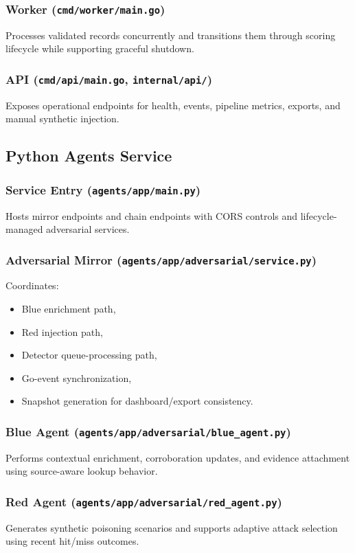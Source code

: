 \documentclass[11pt,a4paper]{article}
\begin{document}
\subsubsection*{Worker (\texttt{cmd/worker/main.go})}
Processes validated records concurrently and transitions them through scoring lifecycle while supporting graceful shutdown.

\subsubsection*{API (\texttt{cmd/api/main.go}, \texttt{internal/api/})}
Exposes operational endpoints for health, events, pipeline metrics, exports, and manual synthetic injection.

\subsection{Python Agents Service}

\subsubsection*{Service Entry (\texttt{agents/app/main.py})}
Hosts mirror endpoints and chain endpoints with CORS controls and lifecycle-managed adversarial services.

\subsubsection*{Adversarial Mirror (\texttt{agents/app/adversarial/service.py})}
Coordinates:
\begin{itemize}[leftmargin=1.5em]
    \item Blue enrichment path,
    \item Red injection path,
    \item Detector queue-processing path,
    \item Go-event synchronization,
    \item Snapshot generation for dashboard/export consistency.
\end{itemize}

\subsubsection*{Blue Agent (\texttt{agents/app/adversarial/blue_agent.py})}
Performs contextual enrichment, corroboration updates, and evidence attachment using source-aware lookup behavior.

\subsubsection*{Red Agent (\texttt{agents/app/adversarial/red_agent.py})}
Generates synthetic poisoning scenarios and supports adaptive attack selection using recent hit/miss outcomes.
\end{document}
